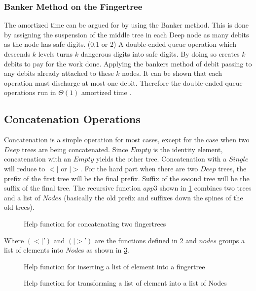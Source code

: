 \subsubsection{Banker Method on the Fingertree}
The amortized time can be argued for by using the Banker method.
This is done by assigning the suspension of the middle tree in each Deep node
as many debits as the node has safe digits. (0,1 or 2) A double-ended queue
operation which descends $k$ levels turns $k$ dangerous digits into safe digits.
By doing so creates $k$ debits to pay for the work done.
Applying the bankers method of debit passing to any debits already attached to
these $k$ nodes. It can be shown that each operation must discharge at most
one debit. Therefore the double-ended queue operations run in $\Theta(1)$
amortized time \cite{fingertree}.


\subsection{Concatenation Operations}
Concatenation is a simple operation for most cases, except for the case when two
$Deep$ trees are being concatenated. Since $Empty$ is the identity element,
concatenation with an $Empty$ yields the other tree. Concatenation with a
$Single$ will reduce to $<|$ or $|>$. For the hard part when there are two
$Deep$ trees, the prefix of the first tree will be the final prefix. Suffix of
the second tree will be the suffix of the final tree. The recursive function
$app3$ shown in \cref{fig:concatHelp} combines two trees and a list of $Nodes$
(basically the old prefix and suffixes down the spines of the old trees).

\begin{figure}[h!]

\caption{Help function for concatenating two fingertrees \label{fig:concatHelp}}
\end{figure}

Where $(<|')$ and $(|>')$ are the functions defined in \cref{fig:reduceAppend}
and $nodes$ groups a list of elements into $Node$s as shown in
\cref{fig:nodesHelp}. 

\begin{figure}[h!]

\caption{Help function for inserting a list of element into a fingertree \label{fig:reduceAppend}}
\end{figure}


\begin{figure}[h!]

\caption{Help function for transforming a list of element into a list of Nodes \label{fig:nodesHelp}}
\end{figure}

